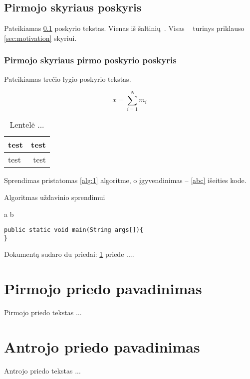 \documentclass[a4paper,12pt,fleqn]{article}
\begin{document}
\subsection{Pirmojo skyriaus poskyris}
\label{sec:example}
Pateikiamas \ref{sec:example} poskyrio tekstas. Vienas iš šaltinių~\cite{KTZ}. Visas ~\cite{KTV} turinys priklauso \ref{sec:motivation} skyriui.

\subsubsection{Pirmojo skyriaus pirmo poskyrio poskyris}
\label{sec:data}
Pateikiamas trečio lygio poskyrio tekstas.

\begin{equation}
x = \sum_{i=1}^N m_i
\end{equation}

\begin{table}[!ht]\centering
\caption{Lentelė ... }
\label{tabl:table}
\begin{tabular}{l|r|}
test&test\\ \hline
test&test\\
\end{tabular}
\end{table}

Sprendimas pristatomas \ref{alg:1} algoritme, o įgyvendinimas -- \ref{abc} išeities kode.

\begin{algorithm}\caption{Algoritmas uždavinio sprendimui}
  \label{alg:1}
  \begin{algorithmic}
    \REQUIRE 
    \ENSURE 
\STATE a \AND b
\end{algorithmic}


\end{algorithm}



\begin{lstlisting}[caption={Pagrindinio metodo žingsniai},label={abc}]
public static void main(String args[]){
}
\end{lstlisting}








\newpage
\begin{appendices}
Dokumentą sudaro du priedai: \ref{app:a} priede  ....
\newpage
\section{Pirmojo priedo pavadinimas}
\label{app:a}
Pirmojo priedo tekstas ...

\newpage
\section{Antrojo priedo pavadinimas}
Antrojo priedo tekstas ...

\end{appendices}
\end{document}
